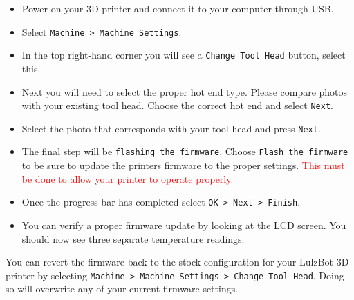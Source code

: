\begin{itemize}
\item Power on your 3D printer and connect it to your computer through USB.
\item Select \texttt{Machine > Machine Settings}.
\item In the top right-hand corner you will see a \texttt{Change Tool Head} button, select this. 
\item Next you will need to select the proper hot end type. Please compare photos with your existing tool head. Choose the correct hot end and select \texttt{Next}.
\item Select the photo that corresponds with your tool head and press \texttt{Next}.
\item The final step will be \texttt{flashing the firmware}. Choose \texttt{Flash the firmware} to be sure to update the printers firmware to the proper settings. \textcolor{red}{This must be done to allow your printer to operate properly.}
\item Once the progress bar has completed select \texttt{OK > Next > Finish}.  
\item You can verify a proper firmware update by looking at the LCD screen. You should now see three separate temperature readings. 
\end{itemize} 
You can revert the firmware back to the stock configuration for your LulzBot 3D printer by selecting \texttt{Machine > Machine Settings > Change Tool Head}. Doing so will overwrite any of your current firmware settings.
